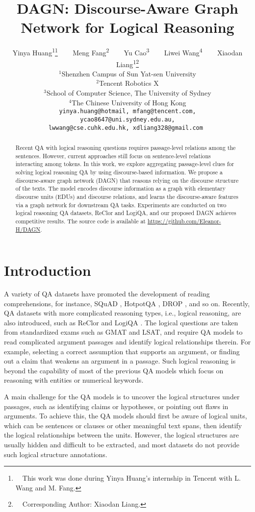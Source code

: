 \documentclass[11pt]{article}
\title{
DAGN: Discourse-Aware Graph Network for Logical Reasoning
}
\author{
  Yinya Huang\textsuperscript{1}\thanks{~~This work was done during Yinya Huang's internship in Tencent with L. Wang and M. Fang.} ~~~
  Meng Fang\textsuperscript{2} ~~~
  Yu Cao\textsuperscript{3} ~~~
  Liwei Wang\textsuperscript{4} ~~~
  Xiaodan Liang\textsuperscript{1}\thanks{~~Corresponding Author: Xiaodan Liang.} \\
  
  $^1$Shenzhen Campus of Sun Yat-sen University \\
  $^2$Tencent Robotics X \\
  $^3$School of Computer Science, The University of Sydney \\
  $^4$The Chinese University of Hong Kong \\
  
  \tt yinya.huang@hotmail,
  \tt mfang@tencent.com, \\
  \tt ycao8647@uni.sydney.edu.au, \\
  \tt lwwang@cse.cuhk.edu.hk,
  \tt xdliang328@gmail.com
}
\newcommand{\moe}[1]{{\color{black} #1}}
\begin{document}
\maketitle
\begin{abstract}
Recent QA with logical reasoning questions requires passage-level relations among the sentences. However, current approaches still focus on sentence-level relations interacting among tokens. In this work, we explore aggregating passage-level clues for solving logical reasoning QA by using discourse-based information. We propose a discourse-aware graph network (DAGN) that reasons relying on the discourse structure of the texts. The model encodes discourse information as a graph with elementary discourse units (EDUs) and discourse relations, and learns the discourse-aware features via a graph network for downstream QA tasks. Experiments are conducted on two logical reasoning QA datasets, ReClor and LogiQA, and our proposed DAGN achieves competitive results. The source code is available at \href{https://github.com/Eleanor-H/DAGN}{https://github.com/Eleanor-H/DAGN}.


\end{abstract}

\section{Introduction}
\vspace{-1mm}
A variety of QA datasets have promoted the development of reading comprehensions, for instance, SQuAD \cite{rajpurkar2016squad}, HotpotQA \cite{yang2018hotpotqa}, DROP \cite{dua2019drop}, \moe{and so on}. 
Recently, QA datasets with more complicated reasoning types, i.e., logical reasoning, are also introduced, such as ReClor \cite{yu2020reclor} and LogiQA \cite{liu2020logiqa}. 
The logical questions are taken from standardized exams such as GMAT and LSAT, and require QA models to read complicated argument passages and 
\moe{identify logical relationships therein. For example, selecting a correct assumption that supports an argument, or finding out a claim that weakens an argument in a passage.} 
Such logical reasoning is beyond the capability of most of the previous QA models which focus on reasoning with entities or numerical keywords.


A main challenge for the QA models is to uncover the logical structures under passages, such as identifying claims or hypotheses, or pointing out flaws in arguments. To achieve this, the QA models should first be aware of logical units, which can be sentences or clauses or other meaningful text spans, then identify the logical relationships between the units. 
However, the logical structures are usually hidden \moe{and difficult to be extracted}, \moe{and most datasets do not provide such logical structure annotations.}
\end{document}
